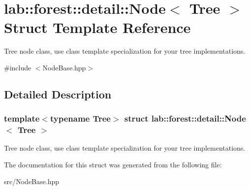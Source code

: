 \hypertarget{structlab_1_1forest_1_1detail_1_1Node}{}\section{lab\+:\+:forest\+:\+:detail\+:\+:Node$<$ Tree $>$ Struct Template Reference}
\label{structlab_1_1forest_1_1detail_1_1Node}


Tree node class, use class template specialization for your tree implementations.  




{\ttfamily \#include $<$Node\+Base.\+hpp$>$}



\subsection{Detailed Description}
\subsubsection*{template$<$typename Tree$>$\newline
struct lab\+::forest\+::detail\+::\+Node$<$ Tree $>$}

Tree node class, use class template specialization for your tree implementations. 

The documentation for this struct was generated from the following file\+:\begin{DoxyCompactItemize}
\item 
src/Node\+Base.\+hpp\end{DoxyCompactItemize}
